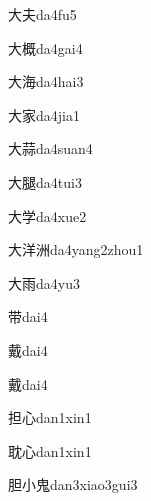 \begin{verbete}[3;4]{大夫}{da4fu5}
\end{verbete}
\begin{verbete}[3;13]{大概}{da4gai4}
\end{verbete}
\begin{verbete}[3;10]{大海}{da4hai3}
\end{verbete}
\begin{verbete}[3;10]{大家}{da4jia1}
\end{verbete}
\begin{verbete}[3;13]{大蒜}{da4suan4}
\end{verbete}
\begin{verbete}[3;13]{大腿}{da4tui3}
\end{verbete}
\begin{verbete}[3;8]{大学}{da4xue2}
\end{verbete}
\begin{verbete*}[3;9;9]{大洋洲}{da4yang2zhou1}
\end{verbete*}
\begin{verbete}[3;8]{大雨}{da4yu3}
\end{verbete}
\begin{verbete}[9]{带}{dai4}
\end{verbete}
\begin{verbete}[17]{戴}{dai4}
\end{verbete}
\begin{verbete*}[17]{戴}{dai4}
\end{verbete*}
\begin{verbete}[8;4]{担心}{dan1xin1}
\end{verbete}
\begin{verbete}[10;4]{耽心}{dan1xin1}
\end{verbete}
\begin{verbete}[9;3;9]{胆小鬼}{dan3xiao3gui3}
\end{verbete}

